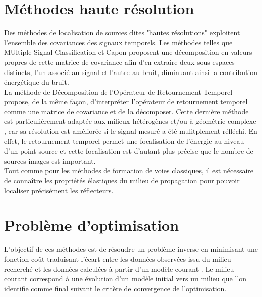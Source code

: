 \section{Méthodes haute résolution}


Des méthodes de localisation de sources dites "hautes résolutions" exploitent l'ensemble des covariances des signaux temporels. Les méthodes telles que MUltiple Signal Classification \citep{schmidt} et Capon \citep{capon} proposent une décomposition en valeurs propres de cette matrice de covariance afin d'en extraire deux sous-espaces distincts, l'un associé au signal et l'autre au bruit, diminuant ainsi la contribution énergétique du bruit. \\

La méthode de Décomposition de l'Opérateur de Retournement Temporel \citep{prada_dort} propose, de la même façon, d'interpréter l'opérateur de retournement temporel comme une matrice de covariance et de la décomposer. Cette dernière méthode est particulièrement adaptée aux milieux hétérogènes et/ou à géométrie complexe , car sa résolution est améliorée si le signal mesuré a été mulitplement réfléchi. En effet, le retournement temporel permet une focalisation de l'énergie au niveau d'un point source et cette focalisation est d'autant plus précise que le nombre de sources images est important. \\
  

Tout comme pour les méthodes de formation de voies classiques, il est nécessaire de connaître les propriétés élastiques du milieu de propagation pour pouvoir localiser précisément les réflecteurs.\\


\section{Problème d'optimisation}

L'objectif de ces méthodes est de résoudre un problème inverse en minimisant une fonction coût traduisant l'écart entre les données observées issu du milieu recherché et les données calculées à partir d'un modèle courant \citep{tarantola_book}. Le milieu courant correspond à une évolution d'un modèle initial vers un milieu que l'on identifie comme final suivant le critère de convergence de l'optimisation.\\


